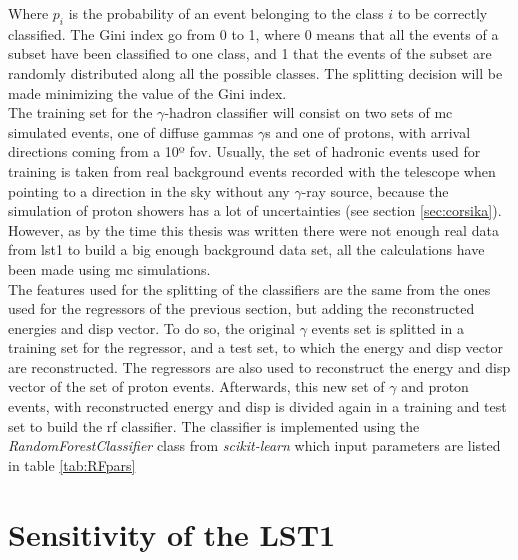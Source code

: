 \documentclass[main.tex]{subfiles}
\begin{document}
Where $p_i$ is the probability of an event belonging to the class $i$ to be correctly classified.  The Gini index go from 0 to 1, where 0 means that all the events of a subset have been classified to one class, and 1 that the events of the subset are randomly distributed along all the possible classes. The splitting decision will be made minimizing the value of the Gini index.\\
The training set for the $\gamma$-hadron classifier will consist on two sets of \gls{mc} simulated events, one of diffuse gammas $\gamma$s and one of protons, with arrival directions coming from a 10º \gls{fov}. Usually, the set of hadronic events used for training is taken from real background events recorded with the telescope when pointing to a direction in the sky without any $\gamma$-ray source, because the simulation of proton showers has a lot of uncertainties (see section \ref{sec:corsika}). However, as by the time this thesis was written there were not enough real data from \gls{lst}1 to build a big enough background data set, all the calculations have been made using \gls{mc} simulations.\\
The features used for the splitting of the classifiers are the same from the ones used for the regressors of the previous section, but adding the reconstructed energies and disp vector. To do so, the original $\gamma$ events set is splitted in a training set for the regressor, and a test set, to which the energy and disp vector are reconstructed. The regressors are also used to reconstruct the energy and disp vector of the set of proton events. Afterwards, this new set of $\gamma$ and proton events, with reconstructed energy and disp is divided again in a training and test set to build the \gls{rf} classifier.
The classifier is implemented using the \textit{RandomForestClassifier} class from \textit{scikit-learn} which input parameters are listed in table \ref{tab:RFpars}


\section{Sensitivity of the LST1}
\end{document}
